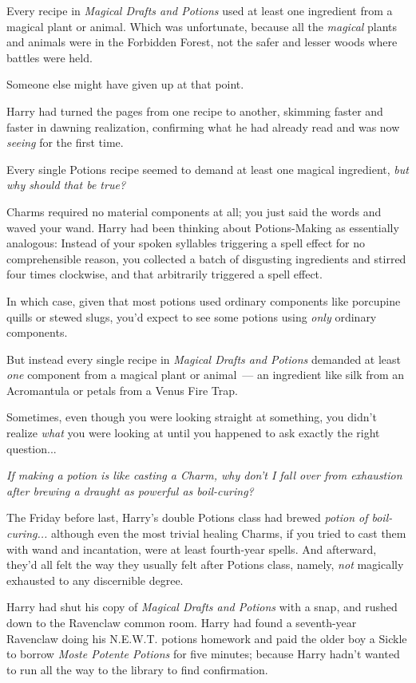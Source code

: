 Every recipe in \emph{Magical Drafts and Potions} used at least one ingredient from a magical plant or animal. Which was unfortunate, because all the \emph{magical} plants and animals were in the Forbidden Forest, not the safer and lesser woods where battles were held.

Someone else might have given up at that point.

Harry had turned the pages from one recipe to another, skimming faster and faster in dawning realization, confirming what he had already read and was now \emph{seeing} for the first time.

Every single Potions recipe seemed to demand at least one magical ingredient, \emph{but why should that be true?}

Charms required no material components at all; you just said the words and waved your wand. Harry had been thinking about Potions-Making as essentially analogous: Instead of your spoken syllables triggering a spell effect for no comprehensible reason, you collected a batch of disgusting ingredients and stirred four times clockwise, and that arbitrarily triggered a spell effect.

In which case, given that most potions used ordinary components like porcupine quills or stewed slugs, you'd expect to see some potions using \emph{only} ordinary components.

But instead every single recipe in \emph{Magical Drafts and Potions} demanded at least \emph{one} component from a magical plant or animal~--- an ingredient like silk from an Acromantula or petals from a Venus Fire Trap.

Sometimes, even though you were looking straight at something, you didn't realize \emph{what} you were looking at until you happened to ask exactly the right question...

\emph{If making a potion is like casting a Charm, why don't I fall over from exhaustion after brewing a draught as powerful as boil-curing?}

The Friday before last, Harry's double Potions class had brewed \emph{potion of boil-curing...} although even the most trivial healing Charms, if you tried to cast them with wand and incantation, were at least fourth-year spells. And afterward, they'd all felt the way they usually felt after Potions class, namely, \emph{not} magically exhausted to any discernible degree.

Harry had shut his copy of \emph{Magical Drafts and Potions} with a snap, and rushed down to the Ravenclaw common room. Harry had found a seventh-year Ravenclaw doing his N.E.W.T. potions homework and paid the older boy a Sickle to borrow \emph{Moste Potente Potions} for five minutes; because Harry hadn't wanted to run all the way to the library to find confirmation.

